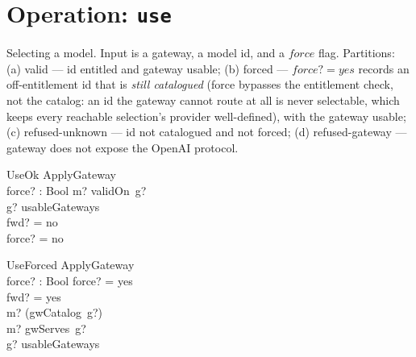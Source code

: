 \documentclass{article}
\begin{document}
\section{Operation: \texttt{use}}

Selecting a model. Input is a gateway, a model id, and a $force$ flag.
Partitions: (a) valid --- id entitled and gateway usable; (b) forced ---
$force? = yes$ records an off-entitlement id that is \emph{still catalogued}
(force bypasses the entitlement check, not the catalog: an id the gateway cannot
route at all is never selectable, which keeps every reachable selection's
provider well-defined), with the gateway usable; (c) refused-unknown --- id not
catalogued and not forced; (d) refused-gateway --- gateway does not expose the
OpenAI protocol.

\begin{schema}{UseOk}
  ApplyGateway \\
  force? : Bool
\where
  m? \in validOn~g? \\
  g? \in usableGateways \\
  fwd? = no \\
  force? = no
\end{schema}

\begin{schema}{UseForced}
  ApplyGateway \\
  force? : Bool
\where
  force? = yes \\
  fwd? = yes \\
  m? \in \dom (gwCatalog~g?) \\
  m? \notin gwServes~g? \\
  g? \in usableGateways
\end{schema}


\end{document}
